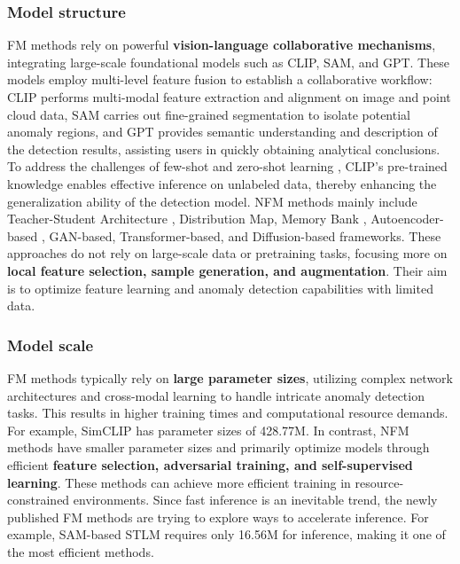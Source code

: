\documentclass[journal,comsoc]{IEEEtran}
\begin{document}
\subsubsection{Model structure}
FM methods rely on powerful \textbf{vision-language collaborative mechanisms}, integrating large-scale foundational models such as CLIP, SAM, and GPT. These models employ multi-level feature fusion to establish a collaborative workflow: CLIP performs multi-modal feature extraction and alignment on image and point cloud data, SAM carries out fine-grained segmentation to isolate potential anomaly regions, and GPT provides semantic understanding and description of the detection results, assisting users in quickly obtaining analytical conclusions. To address the challenges of few-shot and zero-shot learning \cite{chen2024survey}, CLIP’s pre-trained knowledge enables effective inference on unlabeled data, thereby enhancing the generalization ability of the detection model. NFM methods mainly include Teacher-Student Architecture \cite{sun2024memoryless,deng2024structural,chen2024filter,liu2024unlocking}, Distribution Map, Memory Bank \cite{xing2023visual}, Autoencoder-based \cite{liang2024automated}, GAN-based, Transformer-based, and Diffusion-based frameworks. These approaches do not rely on large-scale data or pretraining tasks, focusing more on \textbf{local feature selection, sample generation, and augmentation}. Their aim is to optimize feature learning and anomaly detection capabilities with limited data.
\subsubsection{Model scale}
FM methods typically rely on \textbf{large parameter sizes}, utilizing complex network architectures and cross-modal learning to handle intricate anomaly detection tasks. This results in higher training times and computational resource demands. For example, SimCLIP \cite{deng2024simclip} has parameter sizes of 428.77M. In contrast, NFM methods have smaller parameter sizes and primarily optimize models through efficient \textbf{feature selection, adversarial training, and self-supervised learning}. These methods can achieve more efficient training in resource-constrained environments. Since fast inference is an inevitable trend, the newly published FM methods are trying to explore ways to accelerate inference. For example, SAM-based STLM \cite{li2024sam} requires only 16.56M for inference, making it one of the most efficient methods. 
\end{document}
